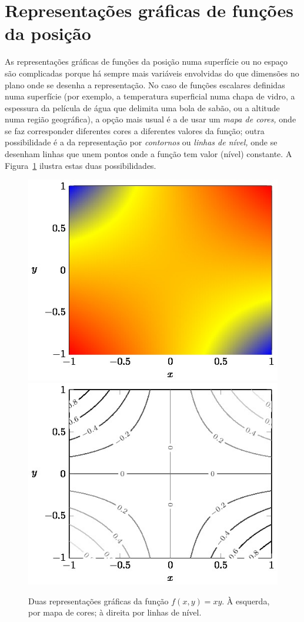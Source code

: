 \section{Representações gráficas de funções da posição}
As representações gráficas de funções da posição numa superfície ou no espaço
são complicadas porque há sempre mais variáveis envolvidas do que dimensões no
plano onde se desenha a representação. No caso de funções escalares definidas
numa superfície (por exemplo, a temperatura superficial numa chapa de vidro, a
espessura da película de água que delimita uma bola de sabão, ou a altitude numa
região geográfica), a opção mais usual é a de usar um \emph{mapa de cores,} onde
se faz corresponder diferentes cores a diferentes valores da função; outra
possibilidade é a da representação por \emph{contornos} ou \emph{linhas de
nível,} onde se desenham linhas que unem pontos onde a função tem valor (nível)
constante. A Figura~\ref{fig:plot2d} ilustra estas duas possibilidades.
\begin{figure}[htb]
{\centering
\includegraphics[width=0.4\linewidth]{figs/f10-plot2d-surf}\hspace{5mm}
\includegraphics[width=0.4\linewidth]{figs/f10-plot2d-cont}\hspace{5mm}
\par
}
\caption{Duas representações gráficas da função $f(x,y)=xy$. À esquerda, por
mapa de cores; à direita por linhas de nível.\label{fig:plot2d}}
\end{figure}

